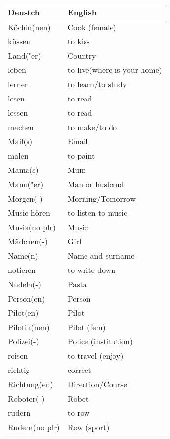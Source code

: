 \documentclass{article}
\renewcommand{\arraystretch}{1}
\begin{document}
\begin{minipage}{0.48\textwidth}
    \centering
    \renewcommand{\arraystretch}{1.5}
    \begin{tabular}{|>{\raggedright\arraybackslash}p{3.5cm}|>{\raggedright\arraybackslash}p{3.5cm}|}
        \hline
        \rowcolor{gray!20} \textbf{Deustch} & \textbf{English} \\
        \hline
        Köchin(nen) & Cook (female) \\\hline
        küssen & to kiss \\\hline
        Land("er) & Country \\\hline
        leben & to live(where is your home) \\\hline
        lernen & to learn/to study \\\hline
        lesen & to read \\\hline
        lessen & to read \\\hline
        machen & to make/to do \\\hline
        Mail(s) & Email \\\hline
        malen & to paint \\\hline
        Mama(s) & Mum \\\hline
        Mann("er) & Man or husband \\\hline
        Morgen(-) & Morning/Tomorrow \\\hline
        Music hören & to listen to music \\\hline
        Musik(no plr) & Music \\\hline
        Mädchen(-) & Girl \\\hline
        Name(n) & Name and surname \\\hline
        notieren & to write down \\\hline
        Nudeln(-) & Pasta \\\hline
        Person(en) & Person \\\hline
        Pilot(en) & Pilot \\\hline
        Pilotin(nen) & Pilot (fem) \\\hline
        Polizei(-) & Police (institution) \\\hline
        reisen & to travel (enjoy) \\\hline
        richtig & correct \\\hline
        Richtung(en) & Direction/Course \\\hline
        Roboter(-) & Robot \\\hline
        rudern & to row \\\hline
        Rudern(no plr) & Row (sport) \\\hline
    \end{tabular}
\end{minipage}%
\end{document}
